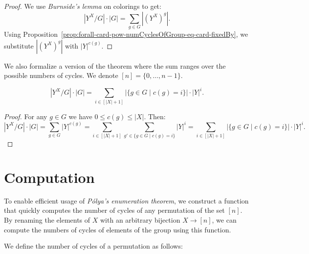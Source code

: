 \begin{proof}
  \leanok
  We use \emph{Burnside's lemma} on colorings to get:
  \begin{equation*}
    |Y^X/G| \cdot |G| = \sum_{g \in G} |(Y^X)^g|.
  \end{equation*}
  Using Proposition~\ref{prop:forall-card-pow-numCyclesOfGroup-eq-card-fixedBy}, we substitute $|(Y^X)^g|$ with $|Y|^{c(g)}$.
\end{proof}

We also formalize a version of the theorem where the sum ranges over the possible numbers of cycles. We denote $[n] = \{0, \dots, n - 1\}$.

\begin{theorem}
  \label{prop:numDistinctColorings-mul-card-group-eq-sum-numGroupOfNumCycles-mul-card-pow}
  \leanok
  \begin{equation*}
    |Y^X/G| \cdot |G| = \sum_{i \in [|X| + 1]} |\{g \in G \mid c(g) = i\}| \cdot |Y|^i.
  \end{equation*}
\end{theorem}

\begin{proof}
  \leanok
  For any $g \in G$ we have $0 \leq c(g) \leq |X|$. Then:
  \begin{equation*}
    |Y^X/G| \cdot |G| = \sum_{g \in G} |Y|^{c(g)} = \sum_{i \in [|X| + 1]} \sum_{g' \in \{g \in G \mid c(g) = i\}} |Y|^i = \sum_{i \in [|X| + 1]} |\{g \in G \mid c(g) = i\}| \cdot |Y|^i.
  \end{equation*}
\end{proof}

\section{Computation}

To enable efficient usage of \emph{Pólya's enumeration theorem}, we construct a function that quickly computes the number of cycles of any permutation of the set $[n]$. By renaming the elements of $X$ with an arbitrary bijection $X \to [n]$, we can compute the numbers of cycles of elements of the group using this function.

We define the number of cycles of a permutation as follows:

